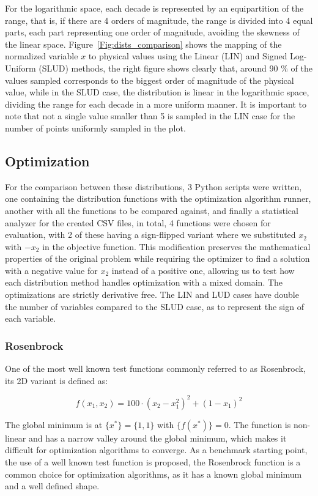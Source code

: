 \documentclass[10pt,fleqn,a4paper,twoside]{article}
\begin{document}
For the logarithmic space, each decade is represented by an equipartition of the range, that is, if there are 4 orders of magnitude, the range is divided into 4 equal parts, each part representing one order of magnitude, avoiding the skewness of the linear space. Figure~\ref{Fig:dists_comparison} shows the mapping of the normalized variable $x$ to physical values using the Linear (LIN) and Signed Log-Uniform (SLUD) methods, the right figure shows clearly that, around 90 \% of the values sampled corresponds to the biggest order of magnitude of the physical value, while in the SLUD case, the distribution is linear in the logarithmic space, dividing the range for each decade in a more uniform manner. It is important to note that not a single value smaller than 5 is sampled in the LIN case for the number of points uniformly sampled in the plot.

\subsection{Optimization}
For the comparison between these distributions, 3 Python scripts were written, one containing the distribution functions with the optimization algorithm runner, another with all the functions to be 
compared against, and finally a statistical analyzer for the created CSV files, in total, 4 functions were chosen for evaluation, with 2 of these having a sign-flipped variant where we substituted $x_2$ with $-x_2$ in the objective function. This modification preserves the mathematical properties of the original problem while requiring the optimizer to find a solution with a negative value for $x_2$ instead of a positive one, 
allowing us to test how each distribution method handles optimization with a mixed domain. The optimizations are strictly derivative free. The LIN and LUD cases have double the number of variables compared to the SLUD case, as to
represent the sign of each variable.

\subsubsection{Rosenbrock}
One of the most well known test functions commonly referred to as Rosenbrock, its 2D variant is defined as:

\begin{equation}
    f(x_1, x_2) = 100 \cdot (x_2 - x_1^2)^2 + (1 - x_1)^2
    \label{Eq:rosenbrock}
\end{equation}

The global minimum is at $\{x^*\} = \{1, 1\}$ with $\{f(x^*)\} = 0$. The function is non-linear and has a narrow valley around the global minimum, which makes it difficult for optimization algorithms to converge.
As a benchmark starting point, the use of a well known test function is proposed, the Rosenbrock function is a common choice for optimization algorithms, as it has a known global minimum and a well defined shape.
\end{document}
